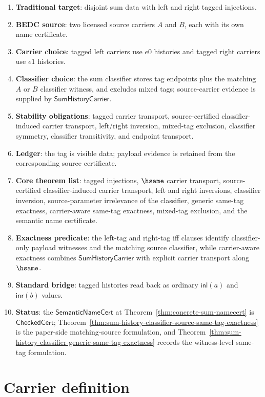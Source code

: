 \begin{enumerate}
  \item \textbf{Traditional target}: disjoint sum data with left and right tagged injections.
  \item \textbf{BEDC source}: two licensed source carriers $A$ and $B$, each with its own name certificate.
  \item \textbf{Carrier choice}: tagged left carriers use $e0$ histories and tagged right carriers use $e1$ histories.
  \item \textbf{Classifier choice}: the sum classifier stores tag endpoints plus the matching $A$ or $B$ classifier witness, and excludes mixed tags; source-carrier evidence is supplied by $\mathsf{SumHistoryCarrier}$.
  \item \textbf{Stability obligations}: tagged carrier transport, source-certified classifier-induced carrier transport, left/right inversion, mixed-tag exclusion, classifier symmetry, classifier transitivity, and endpoint transport.
  \item \textbf{Ledger}: the tag is visible data; payload evidence is retained from the corresponding source certificate.
  \item \textbf{Core theorem list}: tagged injections, $\hsame$ carrier transport, source-certified classifier-induced carrier transport, left and right inversions, classifier inversion, source-parameter irrelevance of the classifier, generic same-tag exactness, carrier-aware same-tag exactness, mixed-tag exclusion, and the semantic name certificate.
  \item \textbf{Exactness predicate}: the left-tag and right-tag iff clauses identify classifier-only payload witnesses and the matching source classifier, while carrier-aware exactness combines $\mathsf{SumHistoryCarrier}$ with explicit carrier transport along $\hsame$.
  \item \textbf{Standard bridge}: tagged histories read back as ordinary $\mathsf{inl}(a)$ and $\mathsf{inr}(b)$ values.
  \item \textbf{Status}: the $\mathsf{SemanticNameCert}$ at Theorem~\ref{thm:concrete-sum-namecert} is $\mathsf{CheckedCert}$; Theorem~\ref{thm:sum-history-classifier-source-same-tag-exactness} is the paper-side matching-source formulation, and Theorem~\ref{thm:sum-history-classifier-generic-same-tag-exactness} records the witness-level same-tag formulation.
\end{enumerate}

\section{Carrier definition}

